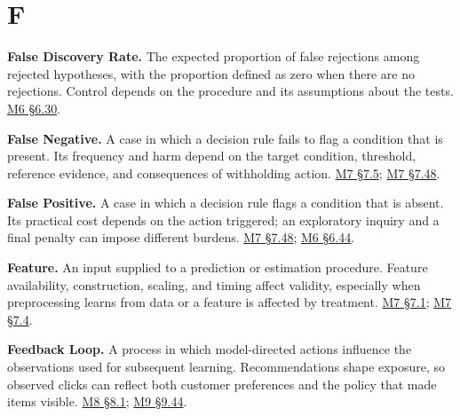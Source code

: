 \par{}
\hypertarget{module-f}{%
\section*{F}\label{module-f}}

\noindent\textbf{False Discovery Rate.} The expected proportion of false
rejections among rejected hypotheses, with the proportion defined as
zero when there are no rejections. Control depends on the procedure and
its assumptions about the tests.
\href{Marketing_Analytics_Lecture_Notes.pdf\#M06-store-assignment-and-false-discoveries}{M6
§6.30}.

\noindent\textbf{False Negative.} A case in which a decision rule fails to flag a
condition that is present. Its frequency and harm depend on the target
condition, threshold, reference evidence, and consequences of
withholding action.
\href{Marketing_Analytics_Lecture_Notes.pdf\#M07-case-study-accuracy-can-conceal-a-useless-model}{M7
§7.5};
\href{Marketing_Analytics_Lecture_Notes.pdf\#M07-prediction-thresholds-and-consumer-consequences}{M7
§7.48}.

\noindent\textbf{False Positive.} A case in which a decision rule flags a
condition that is absent. Its practical cost depends on the action
triggered; an exploratory inquiry and a final penalty can impose
different burdens.
\href{Marketing_Analytics_Lecture_Notes.pdf\#M07-prediction-thresholds-and-consumer-consequences}{M7
§7.48};
\href{Marketing_Analytics_Lecture_Notes.pdf\#M06-type-i-and-type-ii-errors-under-unequal-costs}{M6
§6.44}.

\noindent\textbf{Feature.} An input supplied to a prediction or estimation
procedure. Feature availability, construction, scaling, and timing
affect validity, especially when preprocessing learns from data or a
feature is affected by treatment.
\href{Marketing_Analytics_Lecture_Notes.pdf\#M07-specify-the-forecast-origin-and-target}{M7
§7.1};
\href{Marketing_Analytics_Lecture_Notes.pdf\#M07-validation-cross-validation-and-leakage}{M7
§7.4}.

\noindent\textbf{Feedback Loop.} A process in which model-directed actions
influence the observations used for subsequent learning. Recommendations
shape exposure, so observed clicks can reflect both customer preferences
and the policy that made items visible.
\href{Marketing_Analytics_Lecture_Notes.pdf\#M08-recommendation-systems-learn-from-selected-exposure}{M8
§8.1};
\hyperref[M09-personalization-and-the-learners-authority]{M9
§9.44}.

